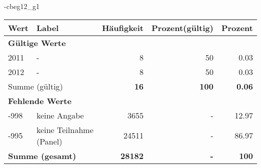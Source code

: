                 \vspace*{-\baselineskip}
					\begin{filecontents}{\jobname-cbeg12_g1}
					\begin{longtable}{lXrrr}
					\toprule
					\textbf{Wert} & \textbf{Label} & \textbf{Häufigkeit} & \textbf{Prozent(gültig)} & \textbf{Prozent} \\
					\endhead
					\midrule
					\multicolumn{5}{l}{\textbf{Gültige Werte}}\\

					2011 &
					\multicolumn{1}{X}{ -  } &


					  \num{8} &
					  \num[round-mode=places,round-precision=2]{50} &
					    \num[round-mode=places,round-precision=2]{0,03} \\

					2012 &
					\multicolumn{1}{X}{ -  } &


					  \num{8} &
					  \num[round-mode=places,round-precision=2]{50} &
					    \num[round-mode=places,round-precision=2]{0,03} \\
					\midrule
					\multicolumn{2}{l}{Summe (gültig)} &
					  \textbf{\num{16}} &
					\textbf{100} &
					  \textbf{\num[round-mode=places,round-precision=2]{0,06}} \\
					\multicolumn{5}{l}{\textbf{Fehlende Werte}}\\
							-998 &
							keine Angabe &
							  \num{3655} &
							 - &
							  \num[round-mode=places,round-precision=2]{12,97} \\
							-995 &
							keine Teilnahme (Panel) &
							  \num{24511} &
							 - &
							  \num[round-mode=places,round-precision=2]{86,97} \\
					\midrule
					\multicolumn{2}{l}{\textbf{Summe (gesamt)}} &
				      \textbf{\num{28182}} &
				    \textbf{-} &
				    \textbf{100} \\
					\bottomrule
					\end{longtable}
					\end{filecontents}
				\label{tableValues:cbeg12_g1}
				\vspace*{-\baselineskip}
